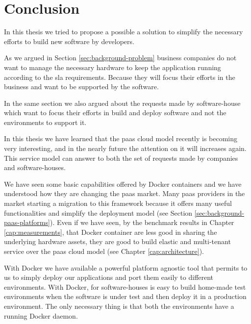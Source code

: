 %
%
\section{Conclusion}
\label{sec:architecture-conclusion}
In this thesis we tried to propose a possible a solution to simplify the necessary efforts to build
new software by developers.

As we argued in Section \ref{sec:background-problem} business companies do not want to manage the
necessary hardware to keep the application running according to the \ac{sla} requirements. Because
they will focus their efforts in the business and want to be supported by the software.

In the same section we also argued about the requests made by software-house which want to focus
their efforts in build and deploy software and not the environments to support it.

In this thesis we have learned that the \ac{paas} cloud model recently is becoming very interesting,
and in the nearly future the attention on it will increases again. This service model can answer to
both the set of requests made by companies and software-houses.

We have seen some basic capabilities offered by Docker containers and we have understood how they are
changing the \ac{paas} market. Many \ac{paas} providers in the market starting a migration to this
framework because it offers many useful functionalities and simplify the deployment model (see Section
\ref{sec:background-paas-platforms}). Even if we have seen, by the benchmark results in Chapter
\ref{cap:measurements}, that Docker container are less good in sharing the underlying hardware
assets, they are good to build elastic and multi-tenant service over the \ac{paas} cloud model
(see Chapter \ref{cap:architecture}).

With Docker we have available a powerful platform agnostic tool that permits to us to simply deploy
our applications and port them easily to different environments. With Docker, for software-houses
is easy to build home-made test environments when the software is under test and then deploy it in
a production environment. The only necessary thing is that both the environments have a running
Docker daemon.